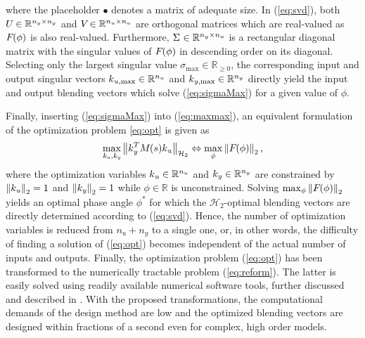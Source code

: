 \documentclass[aerospace,article,submit,moreauthors,pdftex,10pt,a4paper]{Definitions/mdpi}
\begin{document}
%
where the placeholder $\bullet$ denotes a matrix of adequate size.
In (\ref{eq:svd}), both
$\aemat{U}{} \in \mathbb{R}^{n_y \times n_y}$ and 
$\aemat{V}{} \in \mathbb{R}^{n_u \times n_u}$ are
orthogonal matrices which are real-valued as $\aemat{F}{}(\phi)$ is also real-valued.
Furthermore, $\aemat{\Sigma}{} \in \mathbb{R}^{n_y \times n_u}$ is a rectangular diagonal matrix with the singular values of $\aemat{F}{}(\phi)$ in descending order on its diagonal.
Selecting only the largest singular value $\sigma_{\text{max}} \in \mathbb{R}_{\geq 0}$, the corresponding input and output singular vectors $\aevec{k}{u,\text{max}} \in \mathbb{R}^{n_u}$ and $\aevec{k}{y,\text{max}} \in \mathbb{R}^{n_y}$ directly yield the input and output blending vectors which solve (\ref{eq:sigmaMax}) for a given value of $\phi$.

Finally, inserting (\ref{eq:sigmaMax}) into (\ref{eq:maxmax}), an equivalent formulation of the optimization problem \eqref{eq:opt} is given as
%
\begin{align}
\label{eq:reform}
\max_{\aevec{k}{u},\aevec{k}{y}} 
\Hnorm{ \aevec{k}{y}^T \aemat{M}{}(s) \aevec{k}{u} }{2}
\Leftrightarrow
\max_{\phi} \norm{\aemat{F}{}(\phi)}{2},
\end{align}
%
where the optimization variables
$\aevec{k}{u} \in \mathbb{R}^{n_u}$ and 
$\aevec{k}{y} \in \mathbb{R}^{n_y}$ are constrained by
$\norm{\aevec{k}{u}}{2}=1$ and $\norm{\aevec{k}{y}}{2}=1$
while 
$\phi \in \mathbb{R}$ is unconstrained.
Solving $\max_{\phi} \norm{\aemat{F}{}(\phi)}{2}$ yields an optimal phase angle $\phi^*$ for which the $\mathcal{H}_2$-optimal blending vectors are directly determined according to (\ref{eq:svd}).
Hence, the number of optimization variables is reduced from $n_u+n_y$ to a single one, or, in other words, the  difficulty of finding a solution of (\ref{eq:opt}) becomes independent of the actual number of inputs and outputs.
Finally, the optimization problem (\ref{eq:opt}) has been transformed to the numerically tractable problem (\ref{eq:reform}). The latter is easily solved using readily available numerical software tools, further discussed and described in \cite{Pusch18a}. With the proposed transformations, the  computational demands of the design method are low and the optimized blending vectors are designed within fractions of a second even for complex, high order models.
\end{document}

